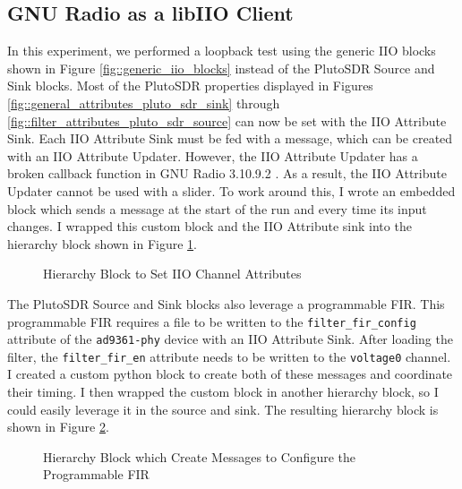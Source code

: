 \documentclass{article}
\begin{document}
\subsection{GNU Radio as a libIIO Client}

In this experiment, we performed a loopback test using the generic IIO blocks shown in Figure \ref{fig::generic_iio_blocks} instead of the PlutoSDR Source and Sink blocks. Most of the PlutoSDR properties displayed in Figures \ref{fig::general_attributes_pluto_sdr_sink} through \ref{fig::filter_attributes_pluto_sdr_source} can now be set with the IIO Attribute Sink. Each IIO Attribute Sink must be fed with a message, which can be created with an IIO Attribute Updater. However, the IIO Attribute Updater has a broken callback function in GNU Radio 3.10.9.2 \cite{analog_devices_broken_iio_block}. As a result, the IIO Attribute Updater cannot be used with a slider. To work around this, I wrote an embedded block which sends a message at the start of the run and every time its input changes. I wrapped this custom block and the IIO Attribute sink into the hierarchy block shown in Figure \ref{fig::iio_input_channel_attribute}.

\begin{figure}[H]
	\centerline{}
	\caption{Hierarchy Block to Set IIO Channel Attributes}
	\label{fig::iio_input_channel_attribute}
\end{figure}

The PlutoSDR Source and Sink blocks also leverage a programmable FIR. This programmable FIR requires a file to be written to the \texttt{filter\_fir\_config} attribute of the \texttt{ad9361-phy} device with an IIO Attribute Sink. After loading the filter, the \texttt{filter\_fir\_en} attribute needs to be written to the \texttt{voltage0} channel. I created a custom python block to create both of these messages and coordinate their timing. I then wrapped the custom block in another hierarchy block, so I could easily leverage it in the source and sink. The resulting hierarchy block is shown in Figure \ref{fig::iio_fir_config}.

\begin{figure}[H]
	\centerline{}
	\caption{Hierarchy Block which Create Messages to Configure the Programmable FIR}
	\label{fig::iio_fir_config}
\end{figure}
\end{document}
